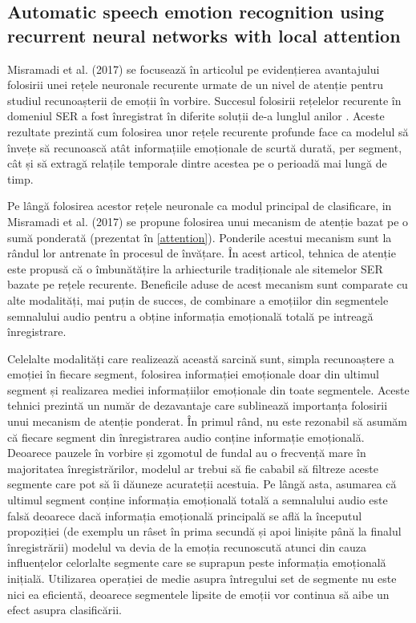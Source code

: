 \documentclass[a4paper,12pt]{book}
\begin{document}
					\subsection{Automatic speech emotion recognition using recurrent neural networks with local attention}
					 \label{prez_misramadi}
					 Misramadi et al. (2017) se focusează în articolul \cite{misramadi} pe evidențierea avantajului folosirii unei rețele neuronale recurente urmate de un nivel de atenție pentru studiul recunoașterii de emoții în vorbire. Succesul folosirii rețelelor recurente în domeniul SER a fost înregistrat în diferite soluții de-a lunglul anilor \cite{yuan,multi-domain,rnn1,rnn2}. Aceste rezultate prezintă cum folosirea unor rețele recurente profunde face ca modelul să învețe să recunoască atât informațiile emoționale de scurtă durată, per segment, cât și să extragă relațile temporale dintre acestea pe o perioadă mai lungă de timp. \par
					 
					 \par 
					 Pe lângă folosirea acestor rețele neuronale ca modul principal de clasificare, in Misramadi et al. (2017) se propune folosirea unui mecanism de atenție bazat pe o sumă ponderată (prezentat în \ref{attention}). Ponderile acestui mecanism sunt la rândul lor antrenate în procesul de învățare. În acest articol, tehnica de atenție este propusă că o îmbunătățire la arhiecturile tradiționale ale sitemelor SER bazate pe rețele recurente. Beneficile aduse de acest mecanism sunt comparate cu alte modalități, mai puțin de succes, de combinare a emoțiilor din segmentele semnalului audio pentru a obține informația emoțională totală pe intreagă înregistrare. \par
					 
					 Celelalte modalități care realizează această sarcină sunt, simpla recunoaștere a emoției în fiecare segment, folosirea informației emoționale doar din ultimul segment și realizarea mediei informațiilor emoționale din toate segmentele. Aceste tehnici prezintă un număr de dezavantaje care sublinează importanța folosirii unui mecanism de atenție ponderat. În primul rând, nu este rezonabil să asumăm că fiecare segment din înregistrarea audio conține informație emoțională. Deoarece pauzele în vorbire și zgomotul de fundal au o frecvență mare în majoritatea înregistrărilor, modelul ar trebui să fie cababil să filtreze aceste segmente care pot să îi dăuneze acurateții acestuia. Pe lângă asta, asumarea că ultimul segment conține informația emoțională totală a semnalului audio este falsă deoarece dacă informația emoțională principală se află la începutul propoziției (de exemplu un râset în prima secundă și apoi linișite până la finalul înregistrării) modelul va devia de la emoția recunoscută atunci din cauza influențelor celorlalte segmente care se suprapun peste informația emoțională inițială. Utilizarea operației de medie asupra întregului set de segmente nu este nici ea eficientă, deoarece segmentele lipsite de emoții vor continua să aibe un efect asupra clasificării. \par
					 
\end{document}
